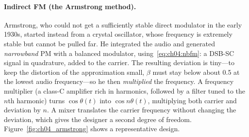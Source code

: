 \paragraph{Indirect FM (the Armstrong method).} Armstrong, who could not get a sufficiently stable direct
modulator in the early 1930s, started instead from a crystal oscillator, whose frequency is extremely
stable but cannot be pulled far. He integrated the audio and generated \emph{narrowband} PM with a
balanced modulator, using~\eqref{eq:ch04:nbfm}: a DSB-SC signal in quadrature, added to the carrier. The
resulting deviation is tiny---to keep the distortion of the approximation small, $\beta$ must stay below
about 0.5 at the lowest audio frequency---so he then \emph{multiplied} the frequency. A frequency
multiplier (a class-C amplifier rich in harmonics, followed by a filter tuned to the $n$th harmonic) turns
$\cos\theta(t)$ into $\cos n\theta(t)$, multiplying both carrier and deviation by $n$. A mixer translates
the carrier frequency without changing the deviation, which gives the designer a second degree of
freedom. Figure~\ref{fig:ch04_armstrong} shows a representative design.

